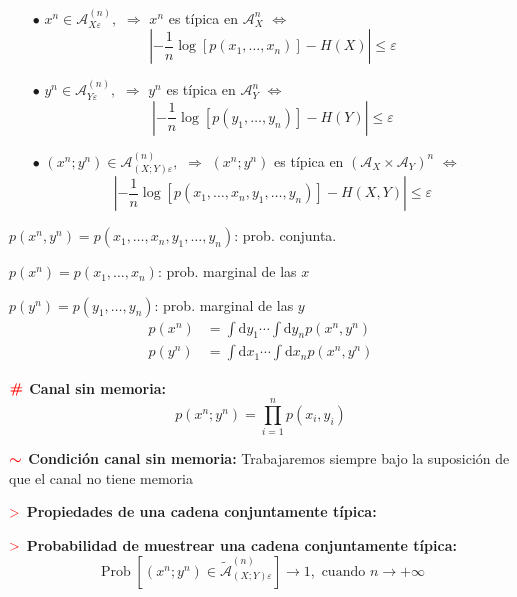 \documentclass[%
 reprint,
 amsmath,amssymb,
 aps,
]{revtex4-1}
\begin{document}
\begin{itemize}
  \item[$\bullet$] $x^{n} \in \mathcal{A}_{X \varepsilon}^{(n)},$ $\Rightarrow$ $x^{n}$ es típica en $\mathcal{A}_{X}^{n}$ $\Leftrightarrow$
  $$
  \left|-\frac{1}{n} \log \left[p\left(x_{1}, \ldots, x_{n}\right)\right]-H(X)\right| \leq \varepsilon
  $$
  \item[$\bullet$] $y^{n} \in \mathcal{A}_{Y \varepsilon}^{(n)},$ $\Rightarrow$ $y^{n}$ es típica en $\mathcal{A}_{Y}^{n}$ $\Leftrightarrow$
  $$
  \left|-\frac{1}{n} \log \left[p\left(y_{1}, \ldots, y_{n}\right)\right]-H(Y)\right| \leq \varepsilon
  $$
  \item[$\bullet$] $\left(x^{n} ; y^{n}\right) \in \mathcal{A}_{(X ; Y) \varepsilon}^{(n)},$ $\Rightarrow$ $\left(x^{n} ; y^{n}\right)$ es típica en $\left(\mathcal{A}_{X} \times \mathcal{A}_{Y}\right)^{n}$  $\Leftrightarrow$
  $$
  \left|-\frac{1}{n} \log \left[p\left(x_{1}, \ldots, x_{n}, y_{1}, \ldots, y_{n}\right)\right]-H(X, Y)\right| \leq \varepsilon
  $$
  
\end{itemize}

$p\left(x^{n}, y^{n}\right)=p\left(x_{1}, \ldots, x_{n}, y_{1}, \ldots, y_{n}\right)$: prob. conjunta.

$p\left(x^{n}\right)=p\left(x_{1}, \ldots, x_{n}\right)$: prob. marginal de las $x$

$p\left(y^{n}\right)=p\left(y_{1}, \ldots, y_{n}\right)$: prob. marginal de las $y$
$$
\begin{aligned}
p\left(x^{n}\right) &=\int \mathrm{d} y_{1} \cdots \int \mathrm{d} y_{n} p\left(x^{n}, y^{n}\right) \\
p\left(y^{n}\right) &=\int \mathrm{d} x_{1} \cdots \int \mathrm{d} x_{n} p\left(x^{n}, y^{n}\right)
\end{aligned}
$$

\textbf{$\color{red}{\textbf{\#}}$ Canal sin memoria:}
$$
p\left(x^{n} ; y^{n}\right)=\prod_{i=1}^{n} p\left(x_{i}, y_{i}\right)
$$

\textbf{$\textcolor{red}{\color{red}{\boldsymbol{\sim}}}$ Condición canal sin memoria:} 
Trabajaremos siempre bajo la suposición de que el canal no tiene memoria

\textbf{$\textcolor{red}{\mathbf{>}}$ Propiedades de una cadena conjuntamente típica:}

\textbf{$\textcolor{red}{\mathbf{>}}$ Probabilidad de muestrear una cadena conjuntamente típica:}
$$
\operatorname{Prob}\left[\left(x^{n} ; y^{n}\right) \in \tilde{\mathcal{A}}_{(X ; Y) \varepsilon}^{(n)}\right] \rightarrow 1, \text { cuando } n \rightarrow+\infty
$$
\end{document}

